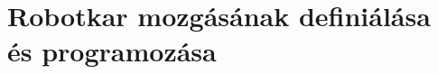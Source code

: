 \documentclass[../documentation.tex]{subfiles}
\begin{document}
\section{Robotkar mozgásának definiálása és programozása}
\end{document}
